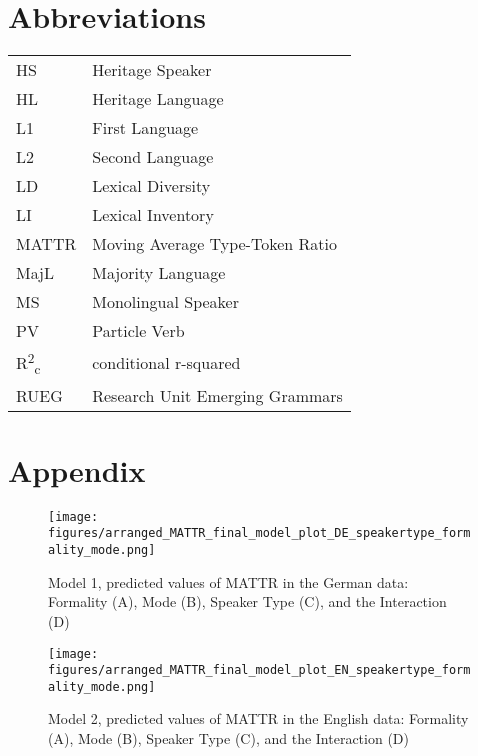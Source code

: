 \documentclass[output=paper,colorlinks,citecolor=brown]{langscibook}
\begin{document}

\section*{Abbreviations}

\begin{tabularx}{\textwidth}{@{}lQ@{}}
HS & Heritage Speaker\\
HL & Heritage Language\\
L1 & First Language\\
L2 & Second Language\\
LD & Lexical Diversity\\
LI & Lexical Inventory\\
MATTR & Moving Average Type-Token Ratio\\
MajL & Majority Language\\
MS & Monolingual Speaker\\
PV & Particle Verb\\
R\textsuperscript{2}\textsubscript{c} & conditional r-squared\\
RUEG & Research Unit Emerging Grammars\\
\end{tabularx}%



\newpage
\section*{Appendix}

\begin{figure}[H]
  \centering
  \texttt{[image: figures/arranged\_MATTR\_final\_model\_plot\_DE\_speakertype\_formality\_mode.png]}
  \caption{Model 1, predicted values of MATTR in the German data: Formality (A), Mode (B), Speaker Type (C), and the Interaction (D)}
  \label{fig:kelleretal:MATTR_formality_mode_speakertype_DE}
\end{figure}
\pagebreak
\hbox{}
\vfill
\begin{figure}[H]
  \centering
  \texttt{[image: figures/arranged\_MATTR\_final\_model\_plot\_EN\_speakertype\_formality\_mode.png]}
  \caption{Model 2, predicted values of MATTR in the English data: Formality (A), Mode (B), Speaker Type (C), and the Interaction (D)}
  \label{fig:kelleretal:MATTR_formality_mode_speakertype_EN}
\end{figure}
\vfill\pagebreak
\end{document}
